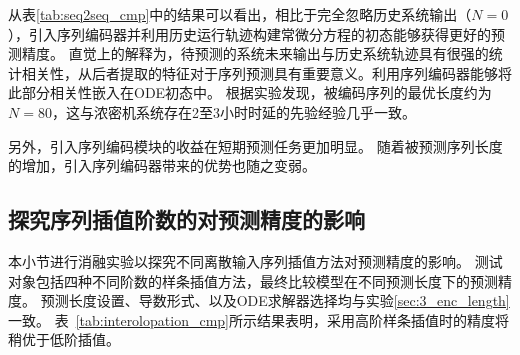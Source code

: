 从表\ref{tab:seq2seq_cmp}中的结果可以看出，相比于完全忽略历史系统输出（$N=0$），引入序列编码器并利用历史运行轨迹构建常微分方程的初态能够获得更好的预测精度。
直觉上的解释为，待预测的系统未来输出与历史系统轨迹具有很强的统计相关性，从后者提取的特征对于序列预测具有重要意义。利用序列编码器能够将此部分相关性嵌入在ODE初态中。
根据实验发现，被编码序列的最优长度约为$N=80$，这与浓密机系统存在2至3小时时延的先验经验几乎一致。

另外，引入序列编码模块的收益在短期预测任务更加明显。
随着被预测序列长度的增加，引入序列编码器带来的优势也随之变弱。

\subsection{探究序列插值阶数的对预测精度的影响}
本小节进行消融实验以探究不同离散输入序列插值方法对预测精度的影响。
测试对象包括四种不同阶数的样条插值方法，最终比较模型在不同预测长度下的预测精度。
预测长度设置、导数形式、以及ODE求解器选择均与实验\ref{sec:3_enc_length}一致。
表~\ref{tab:interolopation_cmp}所示结果表明，采用高阶样条插值时的精度将稍优于低阶插值。
